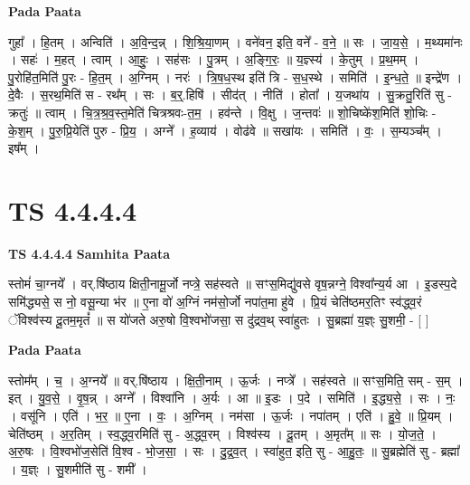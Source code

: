 \documentclass[17pt]{extarticle}
\begin{document}
\textbf{Pada Paata} \newline

गुहा᳚ । हि॒तम् । अन्विति॑ । अ॒वि॒न्द॒न्न् । शि॒श्रि॒या॒णम् । वने॑वन॒ इति॒ वने᳚ - व॒ने॒ ॥ सः । जा॒य॒से॒ । म॒थ्यमा॑नः । सहः॑ । म॒हत् । त्वाम् । आ॒हुः॒ । सह॑सः । पु॒त्रम् । अ॒ङ्गि॒रः॒ ॥ य॒ज्ञ्स्य॑ । के॒तुम् । प्र॒थ॒मम् । पु॒रोहि॑त॒मिति॑ पु॒रः - हि॒त॒म् । अ॒ग्निम् । नरः॑ । त्रि॒ष॒ध॒स्थ इति॑ त्रि - स॒ध॒स्थे । समिति॑ । इ॒न्ध॒ते॒ ॥ इन्द्रे॑ण । दे॒वैः । स॒रथ॒मिति॑ स - रथ᳚म् । सः । ब॒र्॒.हिषि॑ । सीद॑त् । नीति॑ । होता᳚ । य॒जथा॑य । सु॒क्रतु॒रिति॑ सु - क्रतुः॑ ॥ त्वाम् । चि॒त्र॒श्र॒व॒स्त॒मेति॑ चित्रश्रवः-त॒म॒ । हव॑न्ते । वि॒क्षु । ज॒न्तवः॑ ॥ शो॒चिष्के॑श॒मिति॑ शो॒चिः - के॒श॒म् । पु॒रु॒प्रि॒येति॑ पुरु - प्रि॒य॒ । अग्ने᳚ । ह॒व्याय॑ । वोढ॑वे ॥ सखा॑यः । समिति॑ । वः॒ । स॒म्यञ्च᳚म् । इष᳚म् ।  \newline




\section*{ TS 4.4.4.4 }

\textbf{TS 4.4.4.4 } \newline
\textbf{Samhita Paata} \newline

स्तोमं॑ चा॒ग्नये᳚ । वर्.षि॑ष्ठाय क्षिती॒नामू॒र्जो नप्त्रे॒ सह॑स्वते ॥ सꣳस॒मिद्यु॑वसे वृष॒न्नग्ने॒ विश्वा᳚न्य॒र्य आ । इ॒डस्प॒दे समि॑द्ध्यसे॒ स नो॒ वसू॒न्या भ॑र ॥ ए॒ना वो॑ अ॒ग्निं नम॑सो॒र्जो नपा॑त॒मा हु॑वे । प्रि॒यं चेति॑ष्ठमर॒तिꣳ स्व॑द्ध्व॒रं ॅविश्व॑स्य दू॒तम॒मृतं᳚ ॥ स यो॑जते अरु॒षो वि॒श्वभो॑जसा॒ स दु॑द्रव॒थ् स्वा॑हुतः । सु॒ब्रह्मा॑ य॒ज्ञ्ः सु॒शमी॒ - [  ] \newline

\textbf{Pada Paata} \newline

स्तोम᳚म् । च॒ । अ॒ग्नये᳚ ॥ वर्.षि॑ष्ठाय । क्षि॒ती॒नाम् । ऊ॒र्जः । नप्त्रे᳚ । सह॑स्वते ॥ सꣳस॒मिति॒ सम् - स॒म् । इत् । यु॒व॒से॒ । वृ॒ष॒न्न् । अग्ने᳚ । विश्वा॑नि । अ॒र्यः । आ ॥ इ॒डः । प॒दे । समिति॑ । इ॒द्ध्य॒से॒ । सः । नः॒ । वसू॑नि । एति॑ । भ॒र॒ ॥ ए॒ना । वः॒ । अ॒ग्निम् । नम॑सा । ऊ॒र्जः । नपा॑तम् । एति॑ । हु॒वे॒ ॥ प्रि॒यम् । चेति॑ष्ठम् । अ॒र॒तिम् । स्व॒द्ध्व॒रमिति॑ सु - अ॒द्ध्व॒रम् । विश्व॑स्य । दू॒तम् । अ॒मृत᳚म् ॥ सः । यो॒ज॒ते॒ । अ॒रु॒षः । वि॒श्वभो॑ज॒सेति॑ वि॒श्व - भो॒ज॒सा॒ । सः । दु॒द्र॒व॒त् । स्वा॑हुत॒ इति॒ सु - आ॒हु॒तः॒ ॥ सु॒ब्रह्मेति॑ सु - ब्रह्मा᳚ । य॒ज्ञ्ः । सु॒शमीति॑ सु - शमी᳚ ।  \newline
\end{document}
